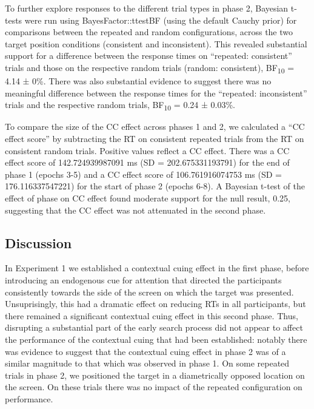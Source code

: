 \documentclass[
  man,
  floatsintext,
  longtable,
  nolmodern,
  notxfonts,
  notimes,
  colorlinks=true,linkcolor=blue,citecolor=blue,urlcolor=blue]{apa7}
\begin{document}
To further explore responses to the different trial types in phase 2,
Bayesian t-tests were run using BayesFactor::ttestBF (using the default
Cauchy prior) for comparisons between the repeated and random
configurations, across the two target position conditions (consistent
and inconsistent). This revealed substantial support for a difference
between the response times on ``repeated: consistent'' trials and those
on the respective random trials (random: consistent),
BF\textsubscript{10} = 4.14 ± 0\%. There was also substantial evidence
to suggest there was no meaningful difference between the response times
for the ``repeated: inconsistent'' trials and the respective random
trials, BF\textsubscript{10} = 0.24 ± 0.03\%.

To compare the size of the CC effect across phases 1 and 2, we
calculated a ``CC effect score'' by subtracting the RT on consistent
repeated trials from the RT on consistent random trials. Positive values
reflect a CC effect. There was a CC effect score of 142.724939987091 ms
(SD = 202.675331193791) for the end of phase 1 (epochs 3-5) and a CC
effect score of 106.761916074753 ms (SD = 176.116337547221) for the
start of phase 2 (epochs 6-8). A Bayesian t-test of the effect of phase
on CC effect found moderate support for the null result, 0.25,
suggesting that the CC effect was not attenuated in the second phase.

\subsection{Discussion}\label{discussion}

In Experiment 1 we established a contextual cuing effect in the first
phase, before introducing an endogenous cue for attention that directed
the participants consistently towards the side of the screen on which
the target was presented. Unsuprisingly, this had a dramatic effect on
reducing RTs in all participants, but there remained a significant
contextual cuing effect in this second phase. Thus, disrupting a
substantial part of the early search process did not appear to affect
the performance of the contextual cuing that had been established:
notably there was evidence to suggest that the contextual cuing effect
in phase 2 was of a similar magnitude to that which was observed in
phase 1. On some repeated trials in phase 2, we positioned the target in
a diametrically opposed location on the screen. On these trials there
was no impact of the repeated configuration on performance.
\end{document}
